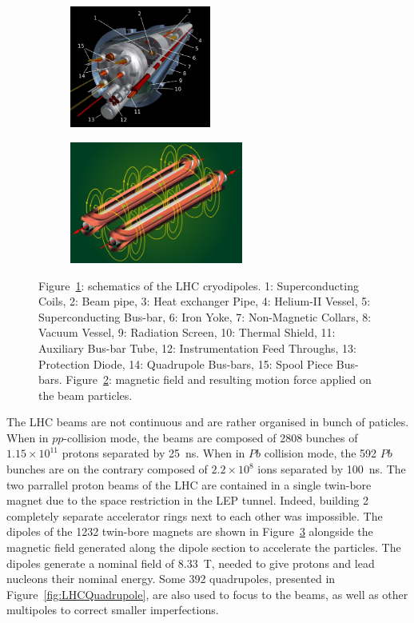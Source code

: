 	\begin{figure}[H]
		\begin{subfigure}{0.5\linewidth}
			\centering
			\includegraphics[height = 4cm]{fig/chapt2/LHC-dipole.png}
			\caption{\label{fig:LHCDipole:A}}
		\end{subfigure}
		\begin{subfigure}{0.5\linewidth}
			\centering
			\includegraphics[height = 4cm]{fig/chapt2/LHC-dipole-field.jpg}
			\caption{\label{fig:LHCDipole:B}}
		\end{subfigure}
		\caption{\label{fig:LHCDipole} Figure~\ref{fig:LHCDipole:A}: schematics of the LHC cryodipoles. 1: Superconducting Coils, 2: Beam pipe, 3: Heat exchanger Pipe, 4: Helium-II Vessel, 5: Superconducting Bus-bar, 6: Iron Yoke, 7: Non-Magnetic Collars, 8: Vacuum Vessel, 9: Radiation Screen, 10: Thermal Shield, 11: Auxiliary Bus-bar Tube, 12: Instrumentation Feed Throughs, 13: Protection Diode, 14: Quadrupole Bus-bars, 15: Spool Piece Bus-bars. Figure~\ref{fig:LHCDipole:B}: magnetic field and resulting motion force applied on the beam particles.}
	\end{figure}
	
	The LHC beams are not continuous and are rather organised in bunch of paticles. When in $pp$-collision mode, the beams are composed of 2808 bunches of $1.15 \times 10^{11}$ protons separated by \SI{25}{ns}. When in $Pb$ collision mode, the 592 $Pb$ bunches are on the contrary composed of $2.2 \times 10^8$ ions separated by \SI{100}{ns}. The two parrallel proton beams of the LHC are contained in a single twin-bore magnet due to the space restriction in the LEP tunnel. Indeed, building 2 completely separate accelerator rings next to each other was impossible. The dipoles of the 1232 twin-bore magnets are shown in Figure~\ref{fig:LHCDipole} alongside the magnetic field generated along the dipole section to accelerate the particles. The dipoles generate a nominal field of \SI{8.33}{T}, needed to give protons and lead nucleons their nominal energy. Some 392 quadrupoles, presented in Figure~\ref{fig:LHCQuadrupole}, are also used to focus to the beams, as well as other multipoles to correct smaller imperfections.
	
